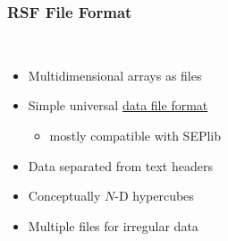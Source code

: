 \begin{frame}
  \MadLogo
  \frametitle{RSF File Format}

\begin{minipage}{0.3\textwidth}
  \begin{center}
  \vfill \ 
\end{center}
  \end{minipage} \hfill
   \begin{minipage}{0.65\textwidth}
\begin{itemize}
  \item Multidimensional arrays as files
  \item Simple universal \href{http://www.ahay.org/Format}{data file format}
  \begin{itemize}
  \item mostly compatible with SEPlib
  \end{itemize}
  \item Data separated from text headers
  \item Conceptually $N$-D hypercubes
  \item Multiple files for irregular data
  \end{itemize}
  \end{minipage}
  
\end{frame}

